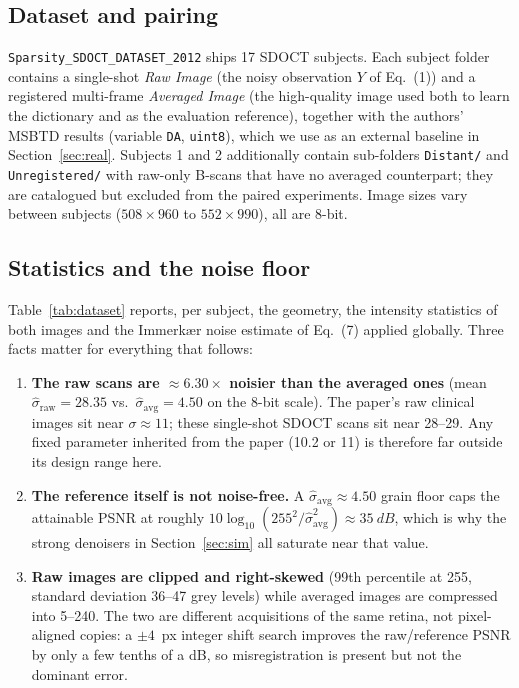 \documentclass[11pt,a4paper]{article}
\newcommand{\sh}{\hat{\sigma}}
\begin{document}
\subsection{Dataset and pairing}

\texttt{Sparsity\_SDOCT\_DATASET\_2012} ships 17 SDOCT subjects. Each subject folder contains a single-shot
\emph{Raw Image} (the noisy observation $Y$ of Eq.~(1)) and a registered multi-frame \emph{Averaged Image} (the
high-quality image used both to learn the dictionary and as the evaluation reference), together with the authors'
MSBTD results (variable \texttt{DA}, \texttt{uint8}), which we use as an external baseline in
Section~\ref{sec:real}. Subjects 1 and 2 additionally contain sub-folders \texttt{Distant/} and \texttt{Unregistered/}
with raw-only B-scans that have no averaged counterpart; they are catalogued but excluded from the paired
experiments. Image sizes vary between subjects ($508\times960$ to $552\times990$), all are 8-bit.

\subsection{Statistics and the noise floor}

Table~\ref{tab:dataset} reports, per subject, the geometry, the intensity statistics of both images and the
Immerkær noise estimate of Eq.~(7) applied globally. Three facts matter for everything that follows:

\begin{enumerate}
  \item \textbf{The raw scans are $\approx6.30\times$ noisier than the averaged ones}
        (mean $\sh_{\text{raw}}=28.35$ vs.\ $\sh_{\text{avg}}=4.50$ on the 8-bit scale). The paper's raw
        clinical images sit near $\sigma\approx11$; these single-shot SDOCT scans sit near 28--29. Any fixed
        parameter inherited from the paper (10.2 or 11) is therefore far outside its design range here.
  \item \textbf{The reference itself is not noise-free.} A $\sh_{\text{avg}}\approx4.50$ grain floor caps the
        attainable PSNR at roughly $10\log_{10}(255^2/\sh_{\text{avg}}^2)\approx\SI{35}{dB}$, which is why the
        strong denoisers in Section~\ref{sec:sim} all saturate near that value.
  \item \textbf{Raw images are clipped and right-skewed} (99th percentile at 255, standard deviation 36--47 grey
        levels) while averaged images are compressed into 5--240. The two are different acquisitions of the same
        retina, not pixel-aligned copies: a $\pm4$~px integer shift search improves the raw/reference PSNR by only
        a few tenths of a dB, so misregistration is present but not the dominant error.
\end{enumerate}
\end{document}
